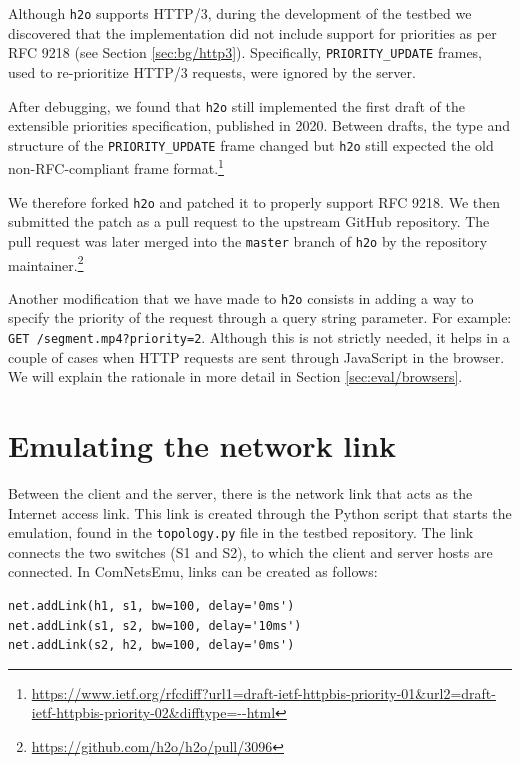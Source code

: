 Although \texttt{h2o} supports HTTP/3, during the development of the testbed we discovered that the implementation did not include support for priorities as per RFC 9218 (see Section \ref{sec:bg/http3}). Specifically, \texttt{PRIORITY\_UPDATE} frames, used to re-prioritize HTTP/3 requests, were ignored by the server.

After debugging, we found that \texttt{h2o} still implemented the first draft of the extensible priorities specification, published in 2020. Between drafts, the type and structure of the \texttt{PRIORITY\_UPDATE} frame changed but \texttt{h2o} still expected the old non-RFC-compliant frame format.\footnote{\url{https://www.ietf.org/rfcdiff?url1=draft-ietf-httpbis-priority-01&url2=draft-ietf-httpbis-priority-02&difftype=--html}}

We therefore forked \texttt{h2o} and patched it to properly support RFC 9218. We then submitted the patch as a pull request to the upstream GitHub repository. The pull request was later merged into the \texttt{master} branch of \texttt{h2o} by the repository maintainer.\footnote{\url{https://github.com/h2o/h2o/pull/3096}}

Another modification that we have made to \texttt{h2o} consists in adding a way to specify the priority of the request through a query string parameter. For example: \texttt{GET /segment.mp4?priority=2}. Although this is not strictly needed, it helps in a couple of cases when HTTP requests are sent through JavaScript in the browser. We will explain the rationale in more detail in Section \ref{sec:eval/browsers}.

\section{Emulating the network link}
\label{sec:testbed/network}

Between the client and the server, there is the network link that acts as the Internet access link. This link is created through the Python script that starts the emulation, found in the \texttt{topology.py} file in the testbed repository. The link connects the two switches (S1 and S2), to which the client and server hosts are connected. In ComNetsEmu, links can be created as follows:

\begin{verbatim}
net.addLink(h1, s1, bw=100, delay='0ms')
net.addLink(s1, s2, bw=100, delay='10ms')
net.addLink(s2, h2, bw=100, delay='0ms')
\end{verbatim}

